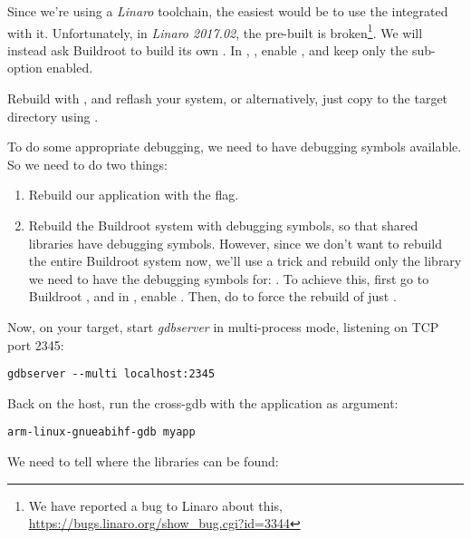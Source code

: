 Since we're using a {\em Linaro} toolchain, the easiest would be to
use the  integrated with it. Unfortunately, in {\em
  Linaro 2017.02}, the pre-built  is
broken\footnote{We have reported a bug to Linaro about this,
  \url{https://bugs.linaro.org/show_bug.cgi?id=3344}}. We will instead
ask Buildroot to build its own . In
, ,
enable , and keep only the  sub-option
enabled.

Rebuild with , and reflash your system, or alternatively,
just copy  to the target
 directory using .

To do some appropriate debugging, we need to have debugging symbols
available. So we need to do two things:

\begin{enumerate}

\item Rebuild our application with the  flag.

\item Rebuild the Buildroot system with debugging symbols, so that
  shared libraries have debugging symbols. However, since we don't
  want to rebuild the entire Buildroot system now, we'll use a trick
  and rebuild only the library we need to have the debugging symbols
  for: . To achieve this, first go to Buildroot
  , and in , enable
  . Then, do  to force the rebuild of just
  .

\end{enumerate}

Now, on your target, start {\em gdbserver} in multi-process mode,
listening on TCP port 2345:

\begin{verbatim}
gdbserver --multi localhost:2345
\end{verbatim}

Back on the host, run the cross-gdb with the  application
as argument:

\begin{verbatim}
arm-linux-gnueabihf-gdb myapp
\end{verbatim}

We need to tell  where the libraries can be found:

